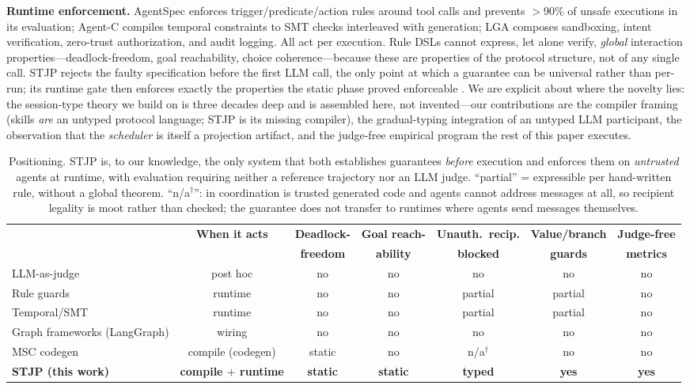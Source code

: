 \documentclass{article}
\newcommand{\stjp}{\textsc{STJP}}
\begin{document}
\textbf{Runtime enforcement.} AgentSpec \citep{agentspec} enforces trigger/predicate/action rules around tool calls and prevents $>$90\% of unsafe executions in its evaluation; Agent-C \citep{agentc} compiles temporal constraints to SMT checks interleaved with generation; LGA \citep{lga} composes sandboxing, intent verification, zero-trust authorization, and audit logging. All act per execution. Rule DSLs cannot express, let alone verify, \emph{global} interaction properties---deadlock-freedom, goal reachability, choice coherence---because these are properties of the protocol structure, not of any single call. \stjp{} rejects the faulty specification before the first LLM call, the only point at which a guarantee can be universal rather than per-run; its runtime gate then enforces exactly the properties the static phase proved enforceable \citep{bocchi13}. We are explicit about where the novelty lies: the session-type theory we build on is three decades deep and is assembled here, not invented---our contributions are the compiler framing (skills \emph{are} an untyped protocol language; \stjp{} is its missing compiler), the gradual-typing integration of an untyped LLM participant, the observation that the \emph{scheduler} is itself a projection artifact, and the judge-free empirical program the rest of this paper executes.

\begin{table}[t]
\centering\small
\caption{Positioning. \stjp{} is, to our knowledge, the only system that both establishes guarantees \emph{before} execution and enforces them on \emph{untrusted} agents at runtime, with evaluation requiring neither a reference trajectory nor an LLM judge. ``partial'' = expressible per hand-written rule, without a global theorem. ``n/a$^{\dagger}$'': in \citet{bollig26} coordination is trusted generated code and agents cannot address messages at all, so recipient legality is moot rather than checked; the guarantee does not transfer to runtimes where agents send messages themselves.}
\label{tab:position}
\begin{tabular}{@{}lcccccc@{}}
\toprule
& \textbf{When it acts} & \textbf{Deadlock-} & \textbf{Goal reach-} & \textbf{Unauth.\ recip.} & \textbf{Value/branch} & \textbf{Judge-free} \\
& & \textbf{freedom} & \textbf{ability} & \textbf{blocked} & \textbf{guards} & \textbf{metrics} \\
\midrule
LLM-as-judge & post hoc & no & no & no & no & no \\
Rule guards \citep{agentspec} & runtime & no & no & partial & partial & no \\
Temporal/SMT \citep{agentc} & runtime & no & no & partial & partial & no \\
Graph frameworks (LangGraph) & wiring & no & no & no & no & no \\
MSC codegen \citep{bollig26} & compile (codegen) & static & no & n/a$^{\dagger}$ & no & no \\
\textbf{\stjp{} (this work)} & \textbf{compile $+$ runtime} & \textbf{static} & \textbf{static} & \textbf{typed} & \textbf{yes} & \textbf{yes} \\
\bottomrule
\end{tabular}
\end{table}
\end{document}

